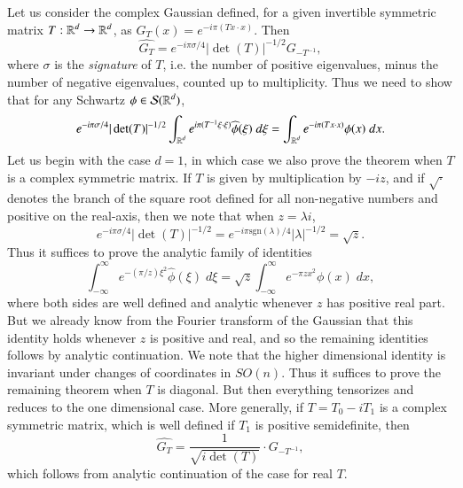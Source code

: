 \begin{example}
  Let us consider the complex Gaussian defined, for a given invertible symmetric matrix $T: \operatorname{\mathbb{R}}^d \to \operatorname{\mathbb{R}}^d$, as $G_T(x) = e^{- i \pi (Tx \cdot x)}$. Then
  \[ \widehat{G_T} = e^{- i \pi \sigma/4} |\det(T)|^{-1/2} G_{-T^{-1}}, \]
  where $\sigma$ is the \emph{signature} of $T$, i.e. the number of positive eigenvalues, minus the number of negative eigenvalues, counted up to multiplicity. Thus we need to show that for any Schwartz $\phi \in \mathcal{S}(\operatorname{\mathbb{R}}^d)$,
  \[ e^{-i \pi \sigma/4} |\det(T)|^{-1/2} \int_{\operatorname{\mathbb{R}}^d} e^{i \pi (T^{-1}\xi \cdot \xi)} \widehat{\phi}(\xi)\; d\xi = \int_{\operatorname{\mathbb{R}}^d} e^{- i \pi (Tx \cdot x)} \phi(x)\; dx. \]
  Let us begin with the case $d = 1$, in which case we also prove the theorem when $T$ is a complex symmetric matrix. If $T$ is given by multiplication by $-iz$, and if $\sqrt{\cdot}$ denotes the branch of the square root defined for all non-negative numbers and positive on the real-axis, then we note that when $z = \lambda i$,
  \[ e^{- i \pi \sigma/4} |\det(T)|^{-1/2} = e^{- i \pi \text{sgn}(\lambda)/4} |\lambda|^{-1/2} = \sqrt{z}. \]
  Thus it suffices to prove the analytic family of identities
  \[ \int_{-\infty}^\infty e^{- (\pi/z) \xi^2} \widehat{\phi}(\xi)\; d\xi = \sqrt{z} \int_{-\infty}^\infty e^{-\pi z x^2} \phi(x)\; dx, \]
  where both sides are well defined and analytic whenever $z$ has positive real part. But we already know from the Fourier transform of the Gaussian that this identity holds whenever $z$ is positive and real, and so the remaining identities follows by analytic continuation. We note that the higher dimensional identity is invariant under changes of coordinates in $SO(n)$. Thus it suffices to prove the remaining theorem when $T$ is diagonal. But then everything tensorizes and reduces to the one dimensional case. More generally, if $T = T_0 - i T_1$ is a complex symmetric matrix, which is well defined if $T_1$ is positive semidefinite, then
  \[ \widehat{G_T} = \frac{1}{\sqrt{i \det(T)}} \cdot G_{-T^{-1}}, \]
  which follows from analytic continuation of the case for real $T$.
\end{example}

